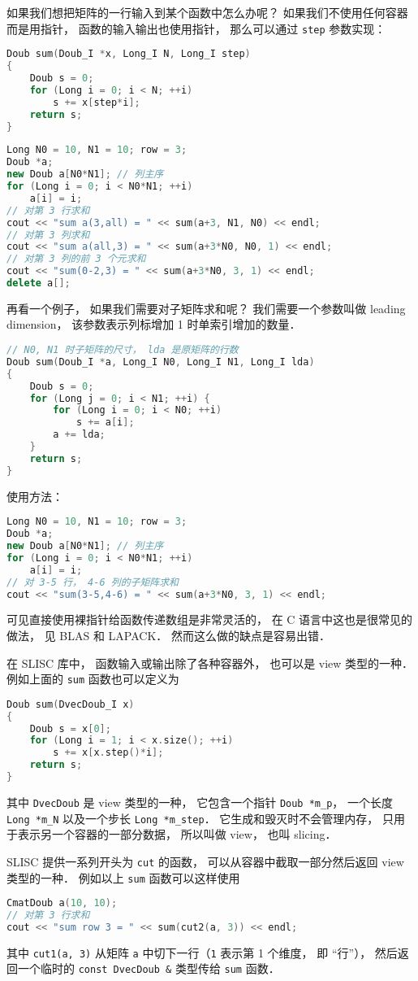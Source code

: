 

如果我们想把矩阵的一行输入到某个函数中怎么办呢？ 如果我们不使用任何容器而是用指针， 函数的输入输出也使用指针， 那么可以通过 \verb|step| 参数实现：
\begin{lstlisting}[language=cpp]
Doub sum(Doub_I *x, Long_I N, Long_I step)
{
    Doub s = 0;
    for (Long i = 0; i < N; ++i)
        s += x[step*i];
    return s;
}
\end{lstlisting}

\begin{lstlisting}[language=cpp]
Long N0 = 10, N1 = 10; row = 3;
Doub *a;
new Doub a[N0*N1]; // 列主序
for (Long i = 0; i < N0*N1; ++i)
    a[i] = i;
// 对第 3 行求和
cout << "sum a(3,all) = " << sum(a+3, N1, N0) << endl;
// 对第 3 列求和
cout << "sum a(all,3) = " << sum(a+3*N0, N0, 1) << endl;
// 对第 3 列的前 3 个元求和
cout << "sum(0-2,3) = " << sum(a+3*N0, 3, 1) << endl;
delete a[];
\end{lstlisting}
再看一个例子， 如果我们需要对子矩阵求和呢？ 我们需要一个参数叫做 leading dimension， 该参数表示列标增加 1 时单索引增加的数量．
\begin{lstlisting}[language=cpp]
// N0, N1 时子矩阵的尺寸， lda 是原矩阵的行数
Doub sum(Doub_I *a, Long_I N0, Long_I N1, Long_I lda)
{
    Doub s = 0;
    for (Long j = 0; i < N1; ++i) {
        for (Long i = 0; i < N0; ++i)
            s += a[i];
        a += lda;
    }
    return s;
}
\end{lstlisting}
使用方法：
\begin{lstlisting}[language=cpp]
Long N0 = 10, N1 = 10; row = 3;
Doub *a;
new Doub a[N0*N1]; // 列主序
for (Long i = 0; i < N0*N1; ++i)
    a[i] = i;
// 对 3-5 行， 4-6 列的子矩阵求和
cout << "sum(3-5,4-6) = " << sum(a+3*N0, 3, 1) << endl;
\end{lstlisting}

可见直接使用裸指针给函数传递数组是非常灵活的， 在 C 语言中这也是很常见的做法， 见 BLAS 和 LAPACK． 然而这么做的缺点是容易出错．

在 SLISC 库中， 函数输入或输出除了各种容器外， 也可以是 view 类型的一种． 例如上面的 \verb|sum| 函数也可以定义为
\begin{lstlisting}[language=cpp]
Doub sum(DvecDoub_I x)
{
    Doub s = x[0];
    for (Long i = 1; i < x.size(); ++i)
        s += x[x.step()*i];
    return s;
}
\end{lstlisting}
其中 \verb|DvecDoub| 是 view 类型的一种， 它包含一个指针 \verb|Doub *m_p|， 一个长度 \verb|Long *m_N| 以及一个步长 \verb|Long *m_step|． 它生成和毁灭时不会管理内存， 只用于表示另一个容器的一部分数据， 所以叫做 view， 也叫 slicing．

SLISC 提供一系列开头为 \verb|cut| 的函数， 可以从容器中截取一部分然后返回 view 类型的一种． 例如以上 \verb|sum| 函数可以这样使用
\begin{lstlisting}[language=cpp]
CmatDoub a(10, 10);
// 对第 3 行求和
cout << "sum row 3 = " << sum(cut2(a, 3)) << endl;
\end{lstlisting}
其中 \verb|cut1(a, 3)| 从矩阵 \verb|a| 中切下一行（\verb|1| 表示第 1 个维度， 即 “行”）， 然后返回一个临时的 \verb|const DvecDoub &| 类型传给 \verb|sum| 函数．
